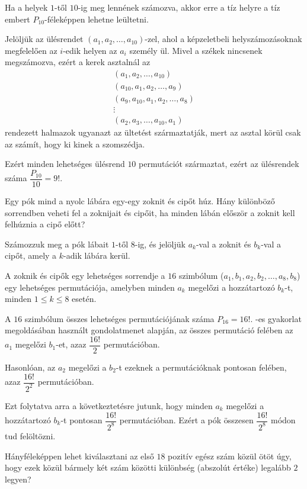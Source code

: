\begin{solution}
Ha a helyek $1$-től $10$-ig meg lennének számozva, akkor erre a
tíz helyre a tíz embert $P_{10}$-féleképpen lehetne leültetni.

Jelöljük az ülésrendet $(a_{1},a_{2},\ldots,a_{10})$-zel, ahol a
képzeletbeli helyszámozásoknak megfelelően az $i$-edik helyen az
$a_{i}$ személy ül. Mivel a székek nincsenek megszámozva, ezért a
kerek asztalnál az 
\[
\begin{array}{c}
(a_{1},a_{2},\ldots,a_{10})\\
(a_{10},a_{1},a_{2},\ldots,a_{9})\\
(a_{9},a_{10},a_{1},a_{2},\ldots,a_{8})\\
\vdots\\
(a_{2},a_{3},\ldots,a_{10},a_{1})
\end{array}
\]
rendezett halmazok ugyanazt az ültetést származtatják, mert az asztal
körül csak az számít, hogy ki kinek a szomszédja.

Ezért minden lehetséges ülésrend $10$ permutációt származtat, ezért
az ülésrendek száma $\dfrac{P_{10}}{10}=9!$. 
\end{solution}
\begin{problem}
Egy pók mind a nyolc lábára egy-egy zoknit és cipőt húz. Hány különböző
sorrendben veheti fel a zoknijait és cipőit, ha minden lábán először
a zoknit kell felhúznia a cipő előtt? 
\end{problem}

\begin{solution}
Számozzuk meg a pók lábait $1$-től $8$-ig, és jelöljük $a_{k}$-val
a zoknit és $b_{k}$-val a cipőt, amely a $k$-adik lábára kerül.

A zoknik és cipők egy lehetséges sorrendje a $16$ szimbólum ($a_{1},b_{1},a_{2},b_{2},\ldots,a_{8},b_{8}$)
egy lehetséges permutációja, amelyben minden $a_{k}$ megelőzi a hozzátartozó
$b_{k}$-t, minden $1\leq k\leq8$ esetén.

A $16$ szimbólum összes lehetséges permutációjának száma $P_{16}=16!$.
-es gyakorlat megoldásában használt gondolatmenet alapján,
az összes permutáció felében az $a_{1}$ megelőzi $b_{1}$-et, azaz
$\dfrac{16!}{2}$ permutációban.

Hasonlóan, az $a_{2}$ megelőzi a $b_{2}$-t ezeknek a permutációknak
pontosan felében, azaz $\dfrac{16!}{2^{2}}$ permutációban.

Ezt folytatva arra a következtetésre jutunk, hogy minden $a_{k}$
megelőzi a hozzátartozó $b_{k}$-t pontosan $\dfrac{16!}{2^{8}}$
permutációban. Ezért a pók összesen $\dfrac{16!}{2^{8}}$ módon tud
felöltözni. 
\end{solution}
\begin{problem}
Hányféleképpen lehet kiválasztani az első $18$ pozitív egész szám
közül ötöt úgy, hogy ezek közül bármely két szám közötti különbség
(abszolút értéke) legalább $2$ legyen? 
\end{problem}

